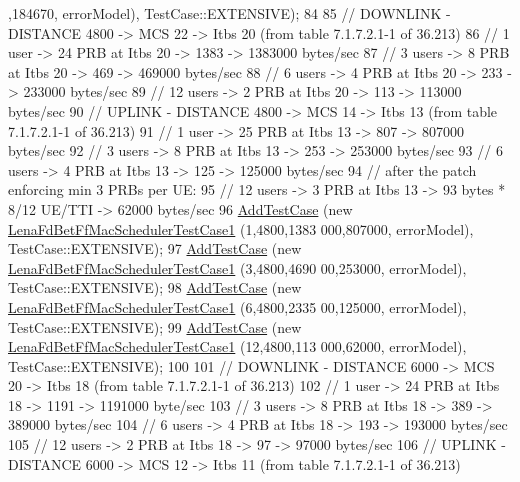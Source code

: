 \begin{DoxyCode}
      ,184670, errorModel), TestCase::EXTENSIVE);
84 
85   \textcolor{comment}{// DOWNLINK - DISTANCE 4800 -> MCS 22 -> Itbs 20 (from table 7.1.7.2.1-1 of 36.213)}
86   \textcolor{comment}{// 1 user -> 24 PRB at Itbs 20 -> 1383 -> 1383000 bytes/sec}
87   \textcolor{comment}{// 3 users -> 8 PRB at Itbs 20 -> 469 -> 469000 bytes/sec}
88   \textcolor{comment}{// 6 users -> 4 PRB at Itbs 20 -> 233 -> 233000 bytes/sec}
89   \textcolor{comment}{// 12 users -> 2 PRB at Itbs 20 -> 113 -> 113000 bytes/sec}
90   \textcolor{comment}{// UPLINK - DISTANCE 4800 -> MCS 14 -> Itbs 13 (from table 7.1.7.2.1-1 of 36.213)}
91   \textcolor{comment}{// 1 user -> 25 PRB at Itbs 13 -> 807 -> 807000 bytes/sec}
92   \textcolor{comment}{// 3 users -> 8 PRB at Itbs 13 -> 253 -> 253000 bytes/sec}
93   \textcolor{comment}{// 6 users -> 4 PRB at Itbs 13 -> 125 -> 125000 bytes/sec}
94   \textcolor{comment}{// after the patch enforcing min 3 PRBs per UE:}
95   \textcolor{comment}{// 12 users -> 3 PRB at Itbs 13 -> 93  bytes * 8/12 UE/TTI  -> 62000 bytes/sec}
96   \hyperlink{classns3_1_1TestCase_a3718088e3eefd5d6454569d2e0ddd835}{AddTestCase} (\textcolor{keyword}{new} \hyperlink{classLenaFdBetFfMacSchedulerTestCase1}{LenaFdBetFfMacSchedulerTestCase1} (1,4800,1383
      000,807000, errorModel), TestCase::EXTENSIVE);
97   \hyperlink{classns3_1_1TestCase_a3718088e3eefd5d6454569d2e0ddd835}{AddTestCase} (\textcolor{keyword}{new} \hyperlink{classLenaFdBetFfMacSchedulerTestCase1}{LenaFdBetFfMacSchedulerTestCase1} (3,4800,4690
      00,253000, errorModel), TestCase::EXTENSIVE);
98   \hyperlink{classns3_1_1TestCase_a3718088e3eefd5d6454569d2e0ddd835}{AddTestCase} (\textcolor{keyword}{new} \hyperlink{classLenaFdBetFfMacSchedulerTestCase1}{LenaFdBetFfMacSchedulerTestCase1} (6,4800,2335
      00,125000, errorModel), TestCase::EXTENSIVE);
99   \hyperlink{classns3_1_1TestCase_a3718088e3eefd5d6454569d2e0ddd835}{AddTestCase} (\textcolor{keyword}{new} \hyperlink{classLenaFdBetFfMacSchedulerTestCase1}{LenaFdBetFfMacSchedulerTestCase1} (12,4800,113
      000,62000, errorModel), TestCase::EXTENSIVE);
100 
101   \textcolor{comment}{// DOWNLINK - DISTANCE 6000 -> MCS 20 -> Itbs 18 (from table 7.1.7.2.1-1 of 36.213)}
102   \textcolor{comment}{// 1 user -> 24 PRB at Itbs 18 -> 1191 -> 1191000 byte/sec}
103   \textcolor{comment}{// 3 users -> 8 PRB at Itbs 18 -> 389 -> 389000 bytes/sec}
104   \textcolor{comment}{// 6 users -> 4 PRB at Itbs 18 -> 193 -> 193000 bytes/sec}
105   \textcolor{comment}{// 12 users -> 2 PRB at Itbs 18 -> 97 -> 97000 bytes/sec}
106   \textcolor{comment}{// UPLINK - DISTANCE 6000 -> MCS 12 -> Itbs 11 (from table 7.1.7.2.1-1 of 36.213)}

\end{DoxyCode}
